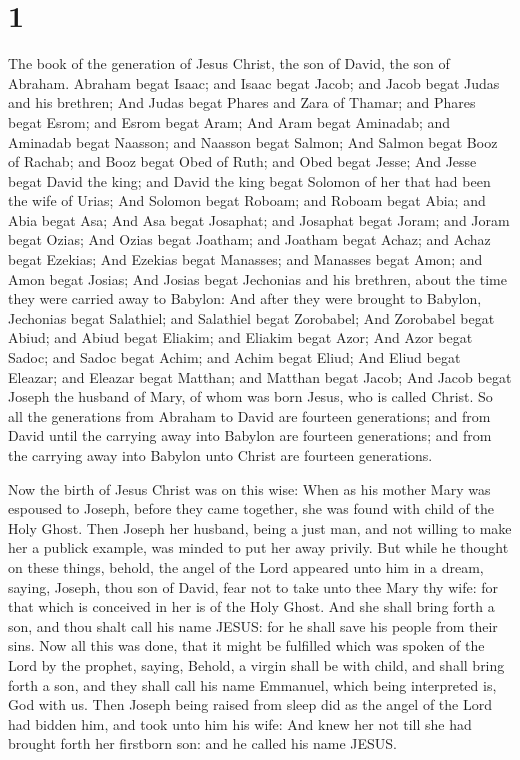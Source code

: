 \hypertarget{section}{%
\section{1}\label{section}}

 The book of the generation of Jesus Christ, the son of
David, the son of Abraham.  Abraham begat Isaac; and Isaac
begat Jacob; and Jacob begat Judas and his brethren;  And
Judas begat Phares and Zara of Thamar; and Phares begat Esrom; and Esrom
begat Aram;  And Aram begat Aminadab; and Aminadab begat
Naasson; and Naasson begat Salmon;  And Salmon begat Booz of
Rachab; and Booz begat Obed of Ruth; and Obed begat Jesse; 
And Jesse begat David the king; and David the king begat Solomon of her
that had been the wife of Urias;  And Solomon begat Roboam;
and Roboam begat Abia; and Abia begat Asa;  And Asa begat
Josaphat; and Josaphat begat Joram; and Joram begat Ozias; 
And Ozias begat Joatham; and Joatham begat Achaz; and Achaz begat
Ezekias;  And Ezekias begat Manasses; and Manasses begat
Amon; and Amon begat Josias;  And Josias begat Jechonias
and his brethren, about the time they were carried away to Babylon:
 And after they were brought to Babylon, Jechonias begat
Salathiel; and Salathiel begat Zorobabel;  And Zorobabel
begat Abiud; and Abiud begat Eliakim; and Eliakim begat Azor;
 And Azor begat Sadoc; and Sadoc begat Achim; and Achim
begat Eliud;  And Eliud begat Eleazar; and Eleazar begat
Matthan; and Matthan begat Jacob;  And Jacob begat Joseph
the husband of Mary, of whom was born Jesus, who is called Christ.
 So all the generations from Abraham to David are fourteen
generations; and from David until the carrying away into Babylon are
fourteen generations; and from the carrying away into Babylon unto
Christ are fourteen generations.

 Now the birth of Jesus Christ was on this wise: When as
his mother Mary was espoused to Joseph, before they came together, she
was found with child of the Holy Ghost.  Then Joseph her
husband, being a just man, and not willing to make her a publick
example, was minded to put her away privily.  But while he
thought on these things, behold, the angel of the Lord appeared unto him
in a dream, saying, Joseph, thou son of David, fear not to take unto
thee Mary thy wife: for that which is conceived in her is of the Holy
Ghost.  And she shall bring forth a son, and thou shalt
call his name JESUS: for he shall save his people from their sins.
 Now all this was done, that it might be fulfilled which
was spoken of the Lord by the prophet, saying,  Behold, a
virgin shall be with child, and shall bring forth a son, and they shall
call his name Emmanuel, which being interpreted is, God with us.
 Then Joseph being raised from sleep did as the angel of
the Lord had bidden him, and took unto him his wife:  And
knew her not till she had brought forth her firstborn son: and he called
his name JESUS.

